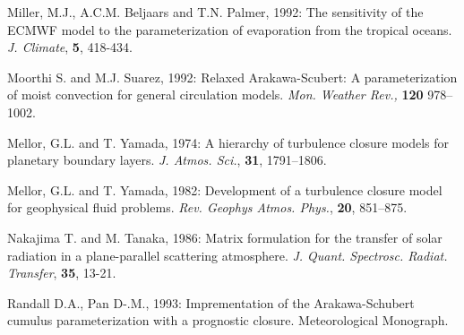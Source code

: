 \begin{description}
\item Miller, M.J., A.C.M. Beljaars and T.N. Palmer, 1992:
      The sensitivity of the ECMWF model 
      to the parameterization of evaporation from the tropical oceans.
      {\it J. Climate}, {\bf 5}, 418-434.

\item Moorthi S. and M.J. Suarez, 1992:
      Relaxed Arakawa-Scubert: A parameterization of moist convection 
      for general circulation models.
      {\em Mon. Weather Rev.,\/} {\bf 120} 978--1002.

\item Mellor, G.L. and T. Yamada, 1974:
      A hierarchy of turbulence closure models
      for planetary boundary layers.
      {\it J. Atmos. Sci.}, {\bf 31}, 1791--1806.

\item Mellor, G.L. and T. Yamada, 1982:
      Development of a turbulence closure
      model for geophysical fluid problems.
      {\it Rev. Geophys Atmos. Phys.}, {\bf 20}, 851--875.  

\item Nakajima T. and M. Tanaka, 1986:
      Matrix formulation for the transfer of solar radiation
      in a plane-parallel scattering atmosphere.
      {\it J. Quant. Spectrosc. Radiat. Transfer}, {\bf 35}, 13-21.

\item Randall D.A., Pan D-.M., 1993:
      Imprementation of the Arakawa-Schubert cumulus parameterization
      with a prognostic closure.
      {Meteorological Monograph.\/}
\end{description}

